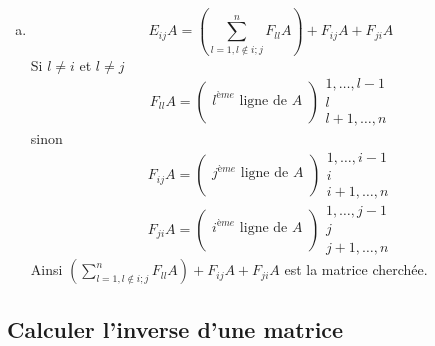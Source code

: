 \begin{enumerate}[a)]
  \item $$E_{ij} A = \left( \sum_{l=1, l \notin {i; j}}^n F_{ll} A \right) + F_{ij} A + F_{ji} A$$
    Si $l\neq i$ et $l\neq j$ 
    $$F_{ll} A =
      \begin{pmatrix}
        \\
        l^{ème} \text{ ligne de } A \\
        \\
      \end{pmatrix} \begin{array}{c} 1, \ldots, l-1 \\ l \\ l+1, \ldots, n \end{array}$$
    sinon
      $$F_{ij} A =
      \begin{pmatrix}
        \\
        j^{ème} \text{ ligne de } A \\
        \\
      \end{pmatrix} \begin{array}{c} 1, \ldots, i-1 \\ i \\ i+1, \ldots, n \end{array}$$
      $$F_{ji} A =
      \begin{pmatrix}
        \\
        i^{ème} \text{ ligne de } A \\
        \\
      \end{pmatrix} \begin{array}{c} 1, \ldots, j-1 \\ j \\ j+1, \ldots, n \end{array}$$
    Ainsi $\left( \sum_{l=1, l \notin {i; j}}^n F_{ll} A \right) + F_{ij} A + F_{ji} A$ est la matrice cherchée.
\end{enumerate}

%
\subsection{Calculer l'inverse d'une matrice}
%
